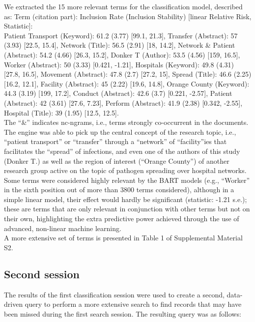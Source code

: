 \documentclass[]{bmcart}
\begin{document}
We extracted the 15 more relevant terms for the classification model,
described as: Term (citation part): Inclusion Rate (Inclusion Stability)
{[}linear Relative Risk, Statistic{]}:\\

Patient Transport (Keyword): 61.2 (3.77) {[}99.1, 21.3{]}, Transfer
(Abstract): 57 (3.93) {[}22.5, 15.4{]}, Network (Title): 56.5 (2.91)
{[}18, 14.2{]}, Network \& Patient (Abstract): 54.2 (4.66) {[}26.3,
15.2{]}, Donker T (Author): 53.5 (4.56) {[}159, 16.5{]}, Worker
(Abstract): 50 (3.33) {[}0.421, -1.21{]}, Hospitals (Keyword): 49.8
(4.31) {[}27.8, 16.5{]}, Movement (Abstract): 47.8 (2.7) {[}27.2, 15{]},
Spread (Title): 46.6 (2.25) {[}16.2, 12.1{]}, Facility (Abstract): 45
(2.22) {[}19.6, 14.8{]}, Orange County (Keyword): 44.3 (3.19) {[}199,
17.2{]}, Conduct (Abstract): 42.6 (3.7) {[}0.221, -2.57{]}, Patient
(Abstract): 42 (3.61) {[}27.6, 7.23{]}, Perform (Abstract): 41.9 (2.38)
{[}0.342, -2.55{]}, Hospital (Title): 39 (1.95) {[}12.5, 12.5{]}.\\

The ``\&'' indicates nc-ngrams, i.e., terms strongly co-occurrent in the
documents.\\
The engine was able to pick up the central concept of the research
topic, i.e., ``patient transport'' or ``transfer'' through a ``network''
of ``facility''ies that facilitates the ``spread'' of infections, and
even one of the authors of this study (Donker T.) as well as the region
of interest (``Orange County'') of another research group active on the
topic of pathogen spreading over hospital networks. Some terms were
considered highly relevant by the BART models (e.g., ``Worker'' in the
sixth position out of more than 3800 terms considered), although in a
simple linear model, their effect would hardly be significant
(statistic: -1.21 s.e.); these are terms that are only relevant in
conjunction with other terms but not on their own, highlighting the
extra predictive power achieved through the use of advanced, non-linear
machine learning.\\
A more extensive set of terms is presented in Table 1 of Supplemental
Material S2.

\subsection*{Second session}

The results of the first classification session were used to create a
second, data-driven query to perform a more extensive search to find
records that may have been missed during the first search session. The
resulting query was as follows:\\
\end{document}
